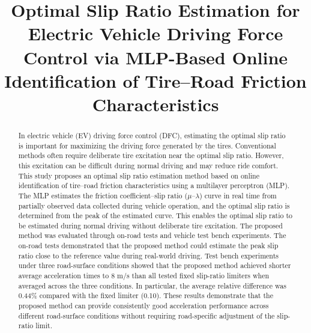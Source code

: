 \documentclass[dvipdfmx,conference]{IEEEtran}
\begin{document}
\relax
{}\relax


\title{Optimal Slip Ratio Estimation for Electric Vehicle Driving Force Control via MLP-Based Online Identification of Tire–Road Friction Characteristics}

\author{

\vspace{1em}

}

\maketitle

\begin{abstract}
In electric vehicle (EV) driving force control (DFC), estimating the optimal slip ratio is important for maximizing the driving force generated by the tires. Conventional methods often require deliberate tire excitation near the optimal slip ratio. However, this excitation can be difficult during normal driving and may reduce ride comfort.
This study proposes an optimal slip ratio estimation method based on online identification of tire–road friction characteristics using a multilayer perceptron (MLP). The MLP estimates the friction coefficient–slip ratio ($\mu$--$\lambda$) curve in real time from partially observed data collected during vehicle operation, and the optimal slip ratio is determined from the peak of the estimated curve. This enables the optimal slip ratio to be estimated during normal driving without deliberate tire excitation.
The proposed method was evaluated through on-road tests and vehicle test bench experiments. The on-road tests demonstrated that the proposed method could estimate the peak slip ratio close to the reference value during real-world driving. Test bench experiments under three road-surface conditions showed that the proposed method achieved shorter average acceleration times to 8 m/s than all tested fixed slip-ratio limiters when averaged across the three conditions. In particular, the average relative difference was 0.44\% compared with the fixed limiter (0.10). These results demonstrate that the proposed method can provide consistently good acceleration performance across different road-surface conditions without requiring road-specific adjustment of the slip-ratio limit.
\end{abstract}
\end{document}
